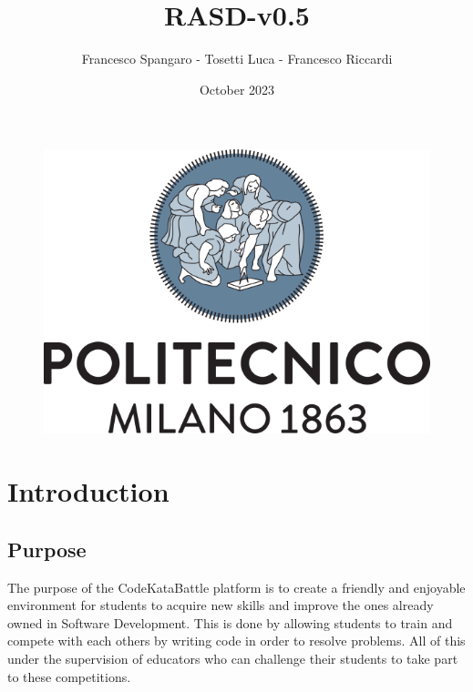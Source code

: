 \documentclass{article}
\title{RASD-v0.5}
\author{Francesco Spangaro - Tosetti Luca - Francesco Riccardi}
\date{October 2023}
\begin{document}
\maketitle

\begin{figure}[h]
    \centering
    \includegraphics[scale=0.5]{politecnico-di-milano-logo.png}
\end{figure}



\tableofcontents

\newpage

\pagestyle{IntroductionStyle}

\section{Introduction}
    \subsection{Purpose}
        The purpose of the CodeKataBattle platform is to create a friendly and enjoyable environment for students
        to acquire new skills and improve the ones already owned in Software Development. This is done by allowing students to train and compete with each others by writing code in order to resolve problems. All of this under the supervision of educators who can challenge their students to take part to these competitions.
\end{document}
